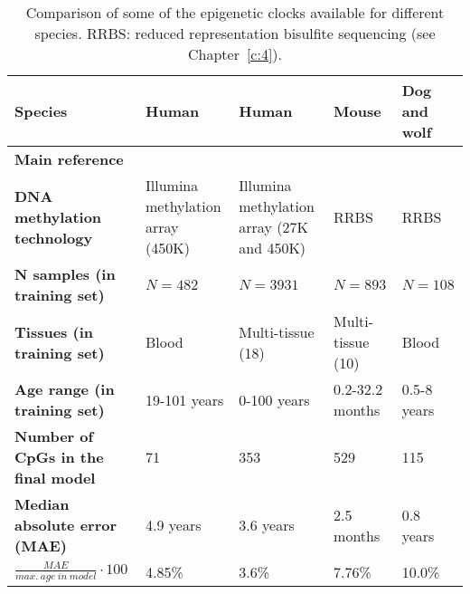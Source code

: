 \begin{table}
	\begin{tabular}{p{3.5cm} | p{2.5cm} p{2.5cm} p{2.5cm} p{2.5cm}}
		\toprule 
		\textbf{Species} & Human & Human & Mouse & Dog and wolf \\
		\midrule
		\textbf{Main reference} & \citet{Hannum2013} & \citet{Horvath2013} & \citet{Thompson2018} & \citet{Thompson2017} \\
		\midrule
		\textbf{DNA methylation technology} & Illumina methylation array (450K) & Illumina methylation array (27K and 450K) & RRBS & RRBS \\
		\midrule
		\textbf{N samples (in training set)} & $N=482$ & $N=3931$ & $N=893$ & $N=108$ \\
		\midrule
		\textbf{Tissues (in training set)} & Blood & Multi-tissue (18) & Multi-tissue (10) & Blood \\
		\midrule
		\textbf{Age range (in training set)} & 19-101 years & 0-100 years & 0.2-32.2 months & 0.5-8 years \\
		\midrule
		\textbf{Number of CpGs in the final model} & 71 & 353 & 529 & 115 \\
		\midrule
		\textbf{Median absolute error (\acrshort{MAE})} & 4.9 years & 3.6 years & 2.5 months & 0.8 years \\
		\midrule
		$\frac{MAE}{max.\ age\ in\ model} \cdot 100$ & 4.85\% & 3.6\% & 7.76\% & 10.0\% \\    
		\bottomrule 
	\end{tabular}
	\vspace*{3mm}
	\caption[Comparison of epigenetic clocks in different species]{Comparison of some of the epigenetic clocks available for different species. \acrshort{RRBS}: reduced representation bisulfite sequencing (see Chapter~\ref{c:4}).}
	\label{tab:clocks}
\end{table}  


